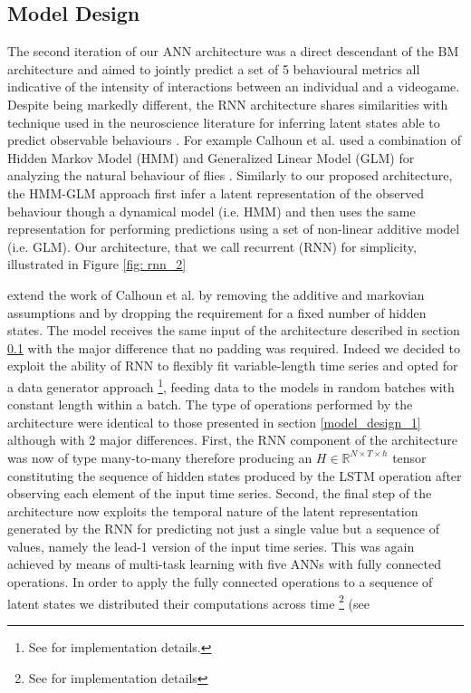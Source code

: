 \subsection{Model Design}
\label{model_design_2}
The second iteration of our ANN architecture was a direct descendant of the BM architecture and aimed to jointly predict a set of 5 behavioural metrics all indicative of the intensity of interactions between an individual and a videogame. Despite being markedly different, the RNN architecture shares similarities with technique used in the neuroscience literature for inferring latent states able to predict observable behaviours \cite{calhoun2019unsupervised}. For example Calhoun et al. used a combination of Hidden Markov Model (HMM) and Generalized Linear Model (GLM) for analyzing the natural behaviour of flies \cite{calhoun2019unsupervised}. Similarly to our proposed architecture, the HMM-GLM approach first infer a latent representation of the observed behaviour though a dynamical model (i.e. HMM) and then uses the same representation for performing predictions using a set of non-linear additive model (i.e. GLM). Our architecture, that we call recurrent (RNN) for simplicity, illustrated in Figure \ref{fig: rnn_2}

extend the work of Calhoun et al. by removing the additive and markovian assumptions and by dropping the requirement for a fixed number of hidden states. The model receives the same input of the architecture described in section \ref{model_design_2} with the major difference that no padding was required. Indeed we decided to exploit the ability of RNN to flexibly fit variable-length time series and opted for a data generator approach \footnote{See \cite{chollet2015keras,tensorflow2015-whitepaper} for implementation details.}, feeding data to the models in random batches with constant length within a batch. The type of operations performed by the architecture were identical to those presented in section \ref{model_design_1} although with 2 major differences. First, the RNN component of the architecture was now of type many-to-many therefore producing an $H \in \mathbb{R}^{N \times T \times h}$ tensor constituting the sequence of hidden states produced by the LSTM operation after observing each element of the input time series\cite{bengio2017deep}. Second, the final step of the architecture now exploits the temporal nature of the latent representation generated by the RNN for predicting not just a single value but a sequence of values, namely the lead-1 version of the input time series. This was again achieved by means of multi-task learning with five ANNs with fully connected operations. In order to apply the fully connected operations to a sequence of latent states we distributed their computations across time \footnote{See \cite{chollet2015keras} for implementation details} (see 

